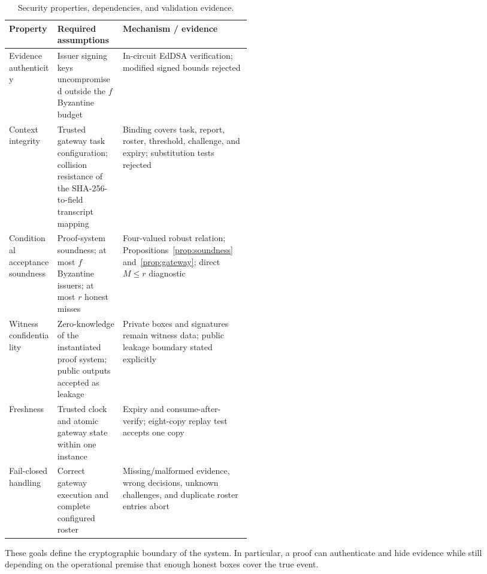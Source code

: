 \documentclass[preprint,review,12pt]{elsarticle}
\begin{document}
\begin{table}[htbp]
\centering\footnotesize
\caption{Security properties, dependencies, and validation evidence.}
\label{tab:security-properties}
\begin{tabularx}{\linewidth}{@{}>{\raggedright\arraybackslash}p{0.20\linewidth}>{\raggedright\arraybackslash}p{0.27\linewidth}>{\raggedright\arraybackslash}X@{}}
\toprule
Property & Required assumptions & Mechanism / evidence\\
\midrule
Evidence authenticity & Issuer signing keys uncompromised outside the $f$ Byzantine budget & In-circuit EdDSA verification; modified signed bounds rejected\\
Context integrity & Trusted gateway task configuration; collision resistance of the SHA-256-to-field transcript mapping & Binding covers task, report, roster, threshold, challenge, and expiry; substitution tests rejected\\
Conditional acceptance soundness & Proof-system soundness; at most $f$ Byzantine issuers; at most $r$ honest misses & Four-valued robust relation; Propositions~\ref{prop:soundness} and~\ref{prop:gateway}; direct $M\le r$ diagnostic\\
Witness confidentiality & Zero-knowledge of the instantiated proof system; public outputs accepted as leakage & Private boxes and signatures remain witness data; public leakage boundary stated explicitly\\
Freshness & Trusted clock and atomic gateway state within one instance & Expiry and consume-after-verify; eight-copy replay test accepts one copy\\
Fail-closed handling & Correct gateway execution and complete configured roster & Missing/malformed evidence, wrong decisions, unknown challenges, and duplicate roster entries abort\\
\bottomrule
\end{tabularx}
\end{table}

These goals define the cryptographic boundary of the system. In particular, a proof can authenticate and hide evidence while still depending on the operational premise that enough honest boxes cover the true event.
\end{document}

